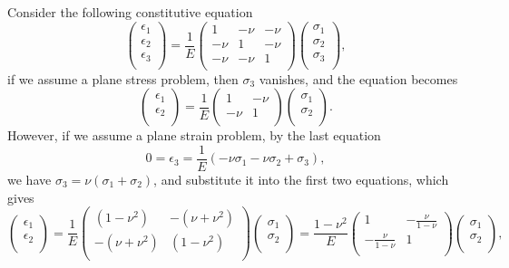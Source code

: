 \documentclass{article}
\begin{document}
Consider the following constitutive equation
\[
\begin{pmatrix}
\epsilon_1 \\ \epsilon_2 \\ \epsilon_3 \\
\end{pmatrix}
=
\frac{1}{E}
\begin{pmatrix}
1 & -\nu & -\nu \\
-\nu & 1 & -\nu \\
-\nu & -\nu & 1 \\
\end{pmatrix}
\begin{pmatrix}
\sigma_1 \\ \sigma_2 \\ \sigma_3 \\
\end{pmatrix}
,
\tag*{(2.4a, b, and c)}
\]
if we assume a plane stress problem, then $\sigma_3$ vanishes, and the equation becomes
\[
\begin{pmatrix}
\epsilon_1 \\ \epsilon_2 \\
\end{pmatrix}
=
\frac{1}{E}
\begin{pmatrix}
1 & -\nu \\
-\nu & 1 \\
\end{pmatrix}
\begin{pmatrix}
\sigma_1 \\ \sigma_2 \\
\end{pmatrix}
.
\]
However, if we assume a plane strain problem, by the last equation
\[
0 = \epsilon_3 = \frac{1}{E} (-\nu \sigma_1 - \nu \sigma_2 + \sigma_3),
\]
we have $\sigma_3 = \nu (\sigma_1 + \sigma_2)$, and substitute it into the first two equations, which gives
\[
\begin{pmatrix}
\epsilon_1 \\ \epsilon_2 \\
\end{pmatrix}
=
\frac{1}{E}
\begin{pmatrix}
(1 - \nu^2) & -(\nu + \nu^2) \\
-(\nu + \nu^2) & (1 - \nu^2) \\
\end{pmatrix}
\begin{pmatrix}
\sigma_1 \\ \sigma_2 \\
\end{pmatrix}
=
\frac{1 - \nu^2}{E}
\begin{pmatrix}
1 & -\frac{\nu}{1 - \nu} \\
-\frac{\nu}{1 - \nu} & 1 \\
\end{pmatrix}
\begin{pmatrix}
\sigma_1 \\ \sigma_2 \\
\end{pmatrix}
,
\]
\end{document}
